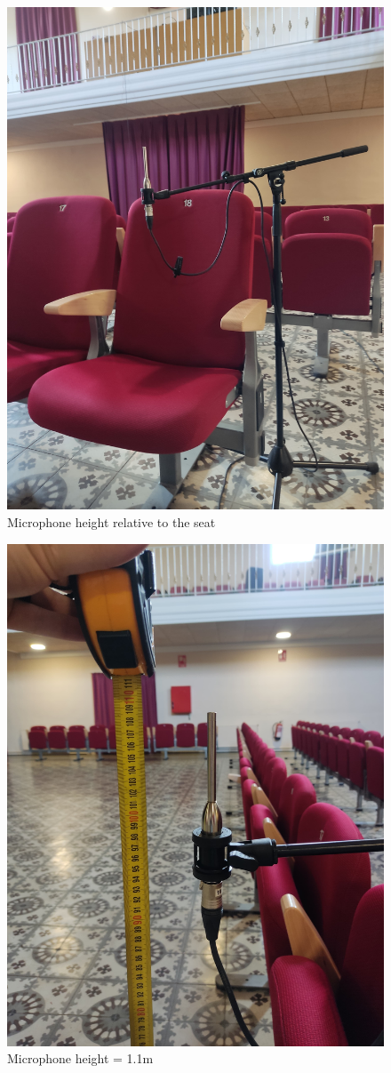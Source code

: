 \begin{figure}[H]
	\centering
	\includegraphics[width=0.6
	\linewidth]{Figures/Coro_micpos1.jpeg}
	\caption{Microphone height relative to the seat}
	\label{fig:Mic_pos1}
\end{figure}

\begin{figure}[H]
	\centering
	\includegraphics[width=0.8
	\linewidth]{Figures/Coro_micpos2.jpeg}
	\caption{Microphone height = 1.1m}
	\label{fig:Mic_pos2}
\end{figure}

